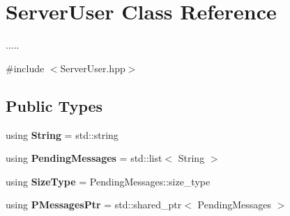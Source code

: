 \hypertarget{classServerUser}{}\section{Server\+User Class Reference}
\label{classServerUser}


.....  




{\ttfamily \#include $<$Server\+User.\+hpp$>$}

\subsection*{Public Types}
\begin{DoxyCompactItemize}
\item 
using {\bfseries String} = std\+::string\hypertarget{classServerUser_ad65781586abf71dbc8ceae3d0588f5a7}{}\label{classServerUser_ad65781586abf71dbc8ceae3d0588f5a7}

\item 
using {\bfseries Pending\+Messages} = std\+::list$<$ String $>$\hypertarget{classServerUser_a201c7266309a8f25e375f9560a3fc56b}{}\label{classServerUser_a201c7266309a8f25e375f9560a3fc56b}

\item 
using {\bfseries Size\+Type} = Pending\+Messages\+::size\+\_\+type\hypertarget{classServerUser_ab9bdd9958601b08bed543287a8869f3d}{}\label{classServerUser_ab9bdd9958601b08bed543287a8869f3d}

\item 
using {\bfseries P\+Messages\+Ptr} = std\+::shared\+\_\+ptr$<$ Pending\+Messages $>$\hypertarget{classServerUser_ab4b74b95dcdcd0d2be56c2becd825a90}{}\label{classServerUser_ab4b74b95dcdcd0d2be56c2becd825a90}

\end{DoxyCompactItemize}
